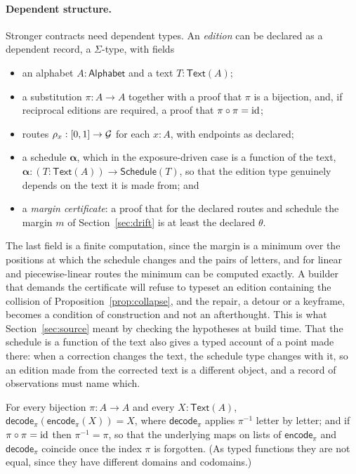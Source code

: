 \paragraph{Dependent structure.}
Stronger contracts need dependent types. An \emph{edition} can be declared as a dependent record, a $\Sigma$-type, with fields
\begin{itemize}[leftmargin=2em,itemsep=1pt]
\item an alphabet $A:\mathsf{Alphabet}$ and a text $T:\mathsf{Text}(A)$;
\item a substitution $\pi:A\to A$ together with a proof that $\pi$ is a bijection, and, if reciprocal editions are required, a proof that $\pi\circ\pi=\mathrm{id}$;
\item routes $\rho_x:[0,1]\to\mathcal{G}$ for each $x:A$, with endpoints as declared;
\item a schedule $\boldsymbol\alpha$, which in the exposure-driven case is a function of the text, $\boldsymbol\alpha:(T:\mathsf{Text}(A))\to\mathsf{Schedule}(T)$, so that the edition type genuinely depends on the text it is made from; and
\item a \emph{margin certificate}: a proof that for the declared routes and schedule the margin $m$ of Section~\ref{sec:drift} is at least the declared $\theta$.
\end{itemize}
The last field is a finite computation, since the margin is a minimum over the positions at which the schedule changes and the pairs of letters, and for linear and piecewise-linear routes the minimum can be computed exactly. A builder that demands the certificate will refuse to typeset an edition containing the collision of Proposition~\ref{prop:collapse}, and the repair, a detour or a keyframe, becomes a condition of construction and not an afterthought. This is what Section~\ref{sec:source} meant by checking the hypotheses at build time. That the schedule is a function of the text also gives a typed account of a point made there: when a correction changes the text, the schedule type changes with it, so an edition made from the corrected text is a different object, and a record of observations must name which.

\begin{proposition}\label{prop:roundtrip}
For every bijection $\pi:A\to A$ and every $X:\mathsf{Text}(A)$, $\mathsf{decode}_\pi(\mathsf{encode}_\pi(X))=X$, where $\mathsf{decode}_\pi$ applies $\pi^{-1}$ letter by letter; and if $\pi\circ\pi=\mathrm{id}$ then $\pi^{-1}=\pi$, so that the underlying maps on lists of $\mathsf{encode}_\pi$ and $\mathsf{decode}_\pi$ coincide once the index $\pi$ is forgotten. (As typed functions they are not equal, since they have different domains and codomains.)
\end{proposition}

